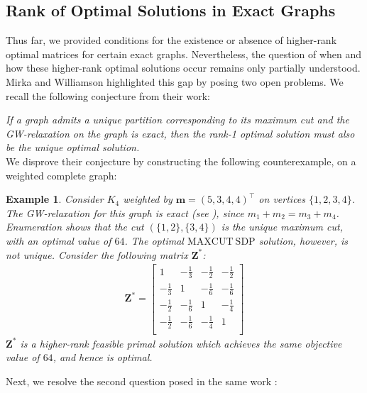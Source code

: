 \documentclass[a4paper,fleqn]{cas-sc}
\newcommand{\1}{\mathbf{1}}
\newcommand{\bZ}{\mathbf{Z}}
\newcommand{\bm}{\mathbf{m}}
\newtheorem{example}{Example}
\begin{document}
\subsection{Rank of Optimal Solutions in Exact Graphs}\label{secMW}

Thus far, we provided conditions for the existence or absence of higher-rank optimal matrices for certain exact graphs. Nevertheless, the question of when and how these higher-rank optimal solutions occur remains only partially understood. Mirka and Williamson \citep{mirka2024max} highlighted this gap by posing two open problems. We recall the following conjecture from their work: \vspace{1mm}

\textit{If a graph admits a unique partition corresponding to its maximum cut and the GW-relaxation on the graph is exact, then the rank-1 optimal solution must also be the unique optimal solution.}\\

We disprove their conjecture by constructing the following counterexample, on a weighted complete graph: 
\begin{example} \label{counter1}
Consider \(K_4\) weighted by \(\bm=(5,3,4,4)^{\top}\) on vertices \(\{1,2,3,4\}\). The GW-relaxation for this graph is exact (see ), since $m_1 + m_2 = m_3 + m_4$. Enumeration shows that the cut \((\{1,2\},\{3,4\})\) is the unique maximum cut, with an optimal value of $64$. The optimal $\mathrm{MAXCUT\ SDP}$ solution, however, is not unique. Consider the following matrix ${\bZ}^*$: 
\begin{align*}
\displaystyle
\bZ^* = \begin{bmatrix}
1 & -\frac{1}{3} & -\frac{1}{2} & -\frac{1}{2}  \\[2mm]
-\frac{1}{3} & 1 & -\frac{1}{6} & -\frac{1}{6}  \\[2mm]
-\frac{1}{2} & -\frac{1}{6} & 1 & -\frac{1}{4}  \\[2mm]
-\frac{1}{2} & -\frac{1}{6} & -\frac{1}{4} & 1 \\ 
\end{bmatrix}
\end{align*}
$\bZ^*$ is a higher-rank feasible primal solution which achieves the same objective value of $64$, and hence is optimal.
\end{example}

Next, we resolve the second question posed in the same work \citep{mirka2024max}:\vspace{1mm}
\end{document}
